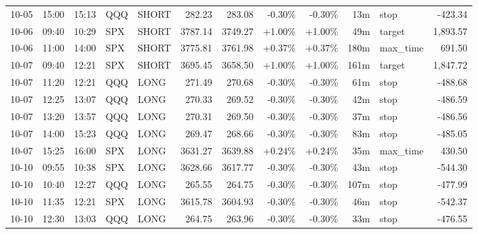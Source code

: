 \documentclass[11pt,a4paper]{article}
\begin{document}
\begin{center}
\begin{longtable}{>{\color{txtmain}}l l l l l r r r r r >{\color{txtmain}}l r}
10-05 & 15:00 & 15:13 & QQQ & SHORT & 282.23 & 283.08 & \textcolor{lossred}{-0.30\%} & \textcolor{lossred}{-0.30\%} & 13m & stop & \textcolor{lossred}{-423.34} \\
10-06 & 09:40 & 10:29 & SPX & SHORT & 3787.14 & 3749.27 & \textcolor{wingreen}{+1.00\%} & \textcolor{wingreen}{+1.00\%} & 49m & target & \textcolor{wingreen}{1,893.57} \\
10-06 & 11:00 & 14:00 & SPX & SHORT & 3775.81 & 3761.98 & \textcolor{wingreen}{+0.37\%} & \textcolor{wingreen}{+0.37\%} & 180m & max\_time & \textcolor{wingreen}{691.50} \\
10-07 & 09:40 & 12:21 & SPX & SHORT & 3695.45 & 3658.50 & \textcolor{wingreen}{+1.00\%} & \textcolor{wingreen}{+1.00\%} & 161m & target & \textcolor{wingreen}{1,847.72} \\
10-07 & 11:20 & 12:21 & QQQ & LONG & 271.49 & 270.68 & \textcolor{lossred}{-0.30\%} & \textcolor{lossred}{-0.30\%} & 61m & stop & \textcolor{lossred}{-488.68} \\
10-07 & 12:25 & 13:07 & QQQ & LONG & 270.33 & 269.52 & \textcolor{lossred}{-0.30\%} & \textcolor{lossred}{-0.30\%} & 42m & stop & \textcolor{lossred}{-486.59} \\
10-07 & 13:20 & 13:57 & QQQ & LONG & 270.31 & 269.50 & \textcolor{lossred}{-0.30\%} & \textcolor{lossred}{-0.30\%} & 37m & stop & \textcolor{lossred}{-486.56} \\
10-07 & 14:00 & 15:23 & QQQ & LONG & 269.47 & 268.66 & \textcolor{lossred}{-0.30\%} & \textcolor{lossred}{-0.30\%} & 83m & stop & \textcolor{lossred}{-485.05} \\
10-07 & 15:25 & 16:00 & SPX & LONG & 3631.27 & 3639.88 & \textcolor{wingreen}{+0.24\%} & \textcolor{wingreen}{+0.24\%} & 35m & max\_time & \textcolor{wingreen}{430.50} \\
10-10 & 09:55 & 10:38 & SPX & LONG & 3628.66 & 3617.77 & \textcolor{lossred}{-0.30\%} & \textcolor{lossred}{-0.30\%} & 43m & stop & \textcolor{lossred}{-544.30} \\
10-10 & 10:40 & 12:27 & QQQ & LONG & 265.55 & 264.75 & \textcolor{lossred}{-0.30\%} & \textcolor{lossred}{-0.30\%} & 107m & stop & \textcolor{lossred}{-477.99} \\
10-10 & 11:35 & 12:21 & SPX & LONG & 3615.78 & 3604.93 & \textcolor{lossred}{-0.30\%} & \textcolor{lossred}{-0.30\%} & 46m & stop & \textcolor{lossred}{-542.37} \\
10-10 & 12:30 & 13:03 & QQQ & LONG & 264.75 & 263.96 & \textcolor{lossred}{-0.30\%} & \textcolor{lossred}{-0.30\%} & 33m & stop & \textcolor{lossred}{-476.55} \\

\end{longtable}
\end{center}
\end{document}
